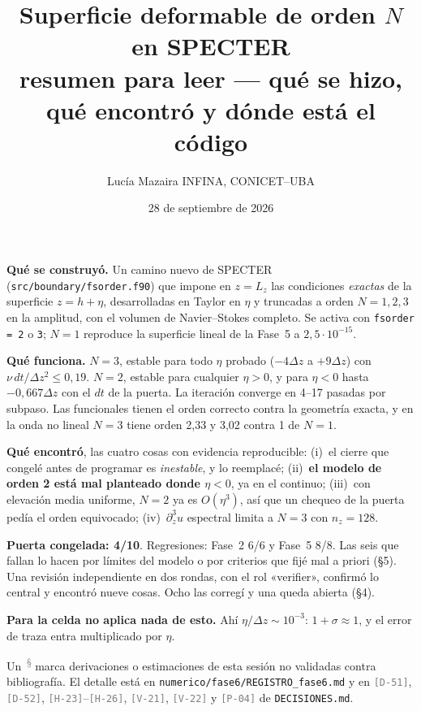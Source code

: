 \documentclass[11pt,a4paper]{article}
\title{\vspace{-1.2cm}Superficie deformable de orden $N$ en SPECTER\\[2pt]
\large resumen para leer --- qué se hizo, qué encontró y dónde está el código}
\author{Lucía Mazaira \quad\small INFINA, CONICET--UBA}
\date{\small 28 de septiembre de 2026}
\newcommand{\etq}[1]{\textcolor{gray}{\texttt{[#1]}}}
\newcommand{\archivo}[1]{\nolinkurl{#1}}
\newcommand{\propio}{\textsuperscript{\textcolor{gray}{\,\S}}}
\newcommand{\NLtresOrd}{2,33 y 3,02}
\begin{document}
\maketitle
\vspace{-0.6cm}

\begin{tcolorbox}[colback=gray!5,colframe=gray!60,boxrule=0.4pt,left=6pt,right=6pt,top=4pt,bottom=4pt,
  title={En una página},fonttitle=\bfseries\small,coltitle=black,colbacktitle=gray!15]
\small
\textbf{Qué se construyó.} Un camino nuevo de SPECTER (\archivo{src/boundary/fsorder.f90}) que
impone en $z=L_z$ las condiciones \emph{exactas} de la superficie $z=h+\eta$, desarrolladas en
Taylor en $\eta$ y truncadas a orden $N=1,2,3$ en la amplitud, con el volumen de Navier--Stokes
completo. Se activa con \texttt{fsorder = 2} o \texttt{3}; $N=1$ reproduce la superficie lineal
de la Fase~5 a $2{,}5\cdot10^{-15}$.

\textbf{Qué funciona.} $N=3$, estable para todo $\eta$ probado ($-4\Delta z$ a $+9\Delta z$)
con $\nu\,dt/\Delta z^2\le0{,}19$. $N=2$, estable para cualquier $\eta>0$, y para $\eta<0$ hasta
$-0{,}667\Delta z$ con el $dt$ de la puerta. La iteración converge en 4--17 pasadas por subpaso. Las funcionales tienen el orden
correcto contra la geometría exacta, y en la onda no lineal $N=3$ tiene orden \NLtresOrd{}
contra 1 de $N=1$.

\textbf{Qué encontró}, las cuatro cosas con evidencia reproducible:
(i)~el cierre que congelé antes de programar es \emph{inestable}, y lo reemplacé;
(ii)~\textbf{el modelo de orden 2 está mal planteado donde $\eta<0$}, ya en el continuo;
(iii)~con elevación media uniforme, $N=2$ ya es $O(\eta^3)$, así que un chequeo de la puerta pedía
el orden equivocado;
(iv)~$\partial_z^3u$ espectral limita a $N=3$ con $n_z=128$.

\textbf{Puerta congelada: 4/10}. Regresiones: Fase~2 6/6 y Fase~5 8/8. Las seis que fallan lo
hacen por límites del modelo o por criterios que fijé mal a priori (§5). Una revisión
independiente en dos rondas, con el rol «verifier», confirmó lo central y encontró nueve cosas.
Ocho las corregí y una queda abierta (§4).

\textbf{Para la celda no aplica nada de esto.} Ahí $\eta/\Delta z\sim10^{-3}$: $1+\sigma\approx1$,
y el error de traza entra multiplicado por $\eta$.
\end{tcolorbox}

\noindent\small Un \propio{} marca derivaciones o estimaciones de esta sesión no validadas contra
bibliografía. El detalle está en \archivo{numerico/fase6/REGISTRO_fase6.md} y en
\etq{D-51}, \etq{D-52}, \etq{H-23}--\etq{H-26}, \etq{V-21}, \etq{V-22} y \etq{P-04} de
\archivo{DECISIONES.md}.\normalsize
\end{document}

